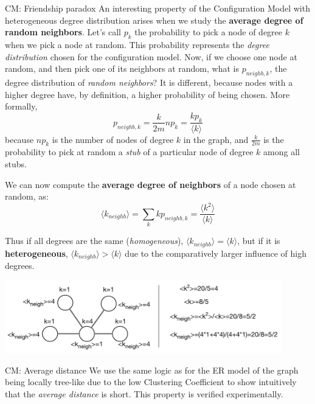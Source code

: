 \documentclass[a4paper,11pt]{book}
\begin{document}
\begin{textbox}{CM: Friendship paradox}
An interesting property of the Configuration Model with heterogeneous degree distribution arises when we study the \textbf{average degree of random neighbors}. Let's call $p_k$ the probability to pick a node of degree $k$ when we pick a node at random. This probability represents the \textit{degree distribution} chosen for the configuration model. Now, if we choose one node at random, and then pick one of its neighbors at random, what is $p_{neighb,k}$, the degree distribution of \textit{random neighbors}? It is different, because nodes with a higher degree have, by definition, a higher probability of being chosen. More formally, 
\[
p_{neighb,k}=\frac{k}{2m}n p_k=\frac{k p_k}{\langle k \rangle}
\]
because $np_k$ is the number of nodes of degree $k$ in the graph, and $\frac{k}{2m}$ is the probability to pick at random a \textit{stub} of a particular node of degree $k$ among all stubs. 

\vspace{0.25cm}

We can now compute the \textbf{average degree of neighbors} of a node chosen at random, as: 
\[
\langle k_{neighb} \rangle = \sum_k k p_{neighb,k} = \frac{\langle k^2 \rangle}{\langle k \rangle}
\]

Thus if all degrees are the same (\textit{homogeneous}), $\langle k_{neighb} \rangle=\langle k \rangle$, but if it is \textbf{heterogeneous}, $\langle k_{neighb} \rangle>\langle k \rangle$ due to the comparatively larger influence of high degrees.


\begin{center}
\includegraphics[width=0.9\textwidth]{pics/friendship.pdf}
\end{center}
\end{textbox}







\begin{textbox}{CM: Average distance}
We use the same logic as for the ER model of the graph being locally tree-like due to the low Clustering Coefficient to show intuitively that the \textit{average distance} is short. This property is verified experimentally.
\end{textbox}
\end{document}
